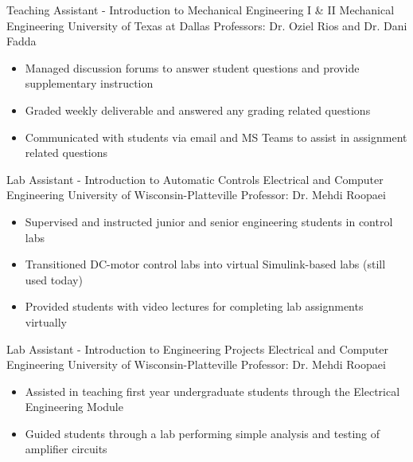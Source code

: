 \documentclass[11pt,letterpaper,roman]{moderncv} %
\begin{document}

{Teaching Assistant - Introduction to Mechanical Engineering I \& II}
{Mechanical Engineering}
{University of Texas at Dallas}
{Professors: Dr. Oziel Rios and Dr. Dani Fadda}
{\begin{itemize}
    \item Managed discussion forums to answer student questions and provide supplementary instruction
    \item Graded weekly deliverable and answered any grading related questions
    \item Communicated with students via email and MS Teams to assist in assignment related questions
\end{itemize}
}

{Lab Assistant - Introduction to Automatic Controls}
{Electrical and Computer Engineering}
{University of Wisconsin-Platteville}
{Professor: Dr. Mehdi Roopaei}
{\begin{itemize}
    \item Supervised and instructed junior and senior engineering students in control labs
    \item Transitioned DC-motor control labs into virtual Simulink-based labs (still used today)
    \item Provided students with video lectures for completing lab assignments virtually
\end{itemize}
}

{Lab Assistant - Introduction to Engineering Projects}
{Electrical and Computer Engineering}
{University of Wisconsin-Platteville}
{Professor: Dr. Mehdi Roopaei}
{\begin{itemize}
    \item Assisted in teaching first year undergraduate students through the Electrical Engineering Module
    \item Guided students through a lab performing simple analysis and testing of amplifier circuits
\end{itemize}
}
\end{document}
